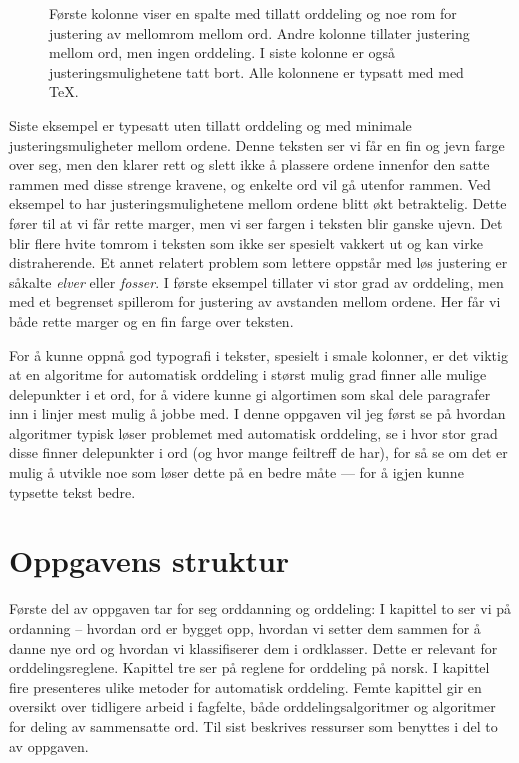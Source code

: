 \begin{figure}

\label{fig:three-columns}
\caption{Første kolonne viser en spalte med tillatt orddeling og noe rom for justering av mellomrom mellom ord. Andre kolonne tillater justering mellom ord, men ingen orddeling. I siste kolonne er også justeringsmulighetene tatt bort. Alle kolonnene er typsatt med med \TeX{}.}
\end{figure}

Siste eksempel er typesatt uten tillatt orddeling og med minimale justeringsmuligheter mellom ordene. Denne teksten ser vi får en fin og jevn farge over seg, men den klarer rett og slett ikke å plassere ordene innenfor den satte rammen med disse strenge kravene, og enkelte ord vil gå utenfor rammen. Ved eksempel to har justeringsmulighetene mellom ordene blitt økt betraktelig. Dette fører til at vi får rette marger, men vi ser fargen i teksten blir ganske ujevn. Det blir flere hvite tomrom i teksten som ikke ser spesielt vakkert ut og kan virke distraherende. Et annet relatert problem som lettere oppstår med løs justering er såkalte \textit{elver} eller \textit{fosser}.  I første eksempel tillater vi stor grad av orddeling, men med et begrenset spillerom for justering av avstanden mellom ordene. Her får vi både rette marger og en fin farge over teksten.

For å kunne oppnå god typografi i tekster, spesielt i smale kolonner, er det viktig at en algoritme for automatisk orddeling i størst mulig grad finner alle mulige delepunkter i et ord, for å videre kunne gi algortimen som skal dele paragrafer inn i linjer mest mulig å jobbe med. I denne oppgaven vil jeg først se på hvordan algoritmer typisk løser problemet med automatisk orddeling, se i hvor stor grad disse finner delepunkter i ord (og hvor mange feiltreff de har), for så se om det er mulig å utvikle noe som løser dette på en bedre måte — for å igjen kunne typsette tekst bedre.

\section{Oppgavens struktur}

Første del av oppgaven tar for seg orddanning og orddeling: I kapittel to ser vi på ordanning -- hvordan ord er bygget opp, hvordan vi setter dem sammen for å danne nye ord og hvordan vi klassifiserer dem i ordklasser. Dette er relevant for orddelingsreglene. Kapittel tre ser på reglene for orddeling på norsk. I kapittel fire presenteres ulike metoder for automatisk orddeling. Femte kapittel gir en oversikt over tidligere arbeid i fagfelte, både orddelingsalgoritmer og algoritmer for deling av sammensatte ord. Til sist beskrives ressurser som benyttes i del to av oppgaven.

